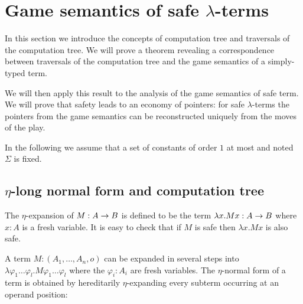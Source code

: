 \section{Game semantics of safe $\lambda$-terms}

In this section we introduce the concepts of computation tree and
traversals of the computation tree. We will prove a theorem
revealing a correspondence between traversals of the computation
tree and the game semantics of a simply-typed term.

We will then apply this result to the analysis of the game semantics
of safe term. We will prove that safety leads to an economy of
pointers: for safe $\lambda$-terms the pointers from the game
semantics can be reconstructed uniquely from the moves of the play.

In the following we assume that a set of constants of order $1$ at
most and noted $\Sigma$ is fixed.

%

\subsection{$\eta$-long normal form and computation tree}

The $\eta$-expansion of $M: A\rightarrow B$ is defined to be the term $\lambda x . M x : A\rightarrow B$ where $x:A$ is a fresh variable.
It is easy to check that if $M$ is safe then $\lambda x . M x$ is also safe.

A term $M : (A_1,\ldots,A_n,o)$ can be expanded in several steps
into $\lambda \varphi_1 \ldots \varphi_l . M \varphi_1 \ldots
\varphi_l$ where the $\varphi_i:A_i$ are fresh variables. The
$\eta$-normal form of a term is obtained by hereditarily
$\eta$-expanding every subterm occurring at an operand position:

